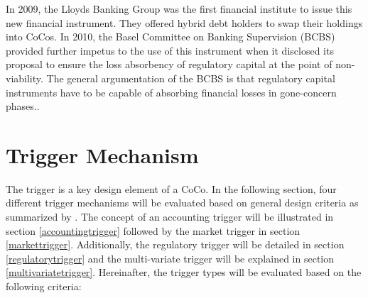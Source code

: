 In 2009, the Lloyds Banking Group was the first financial institute to issue this new financial instrument. They offered hybrid debt holders to swap their holdings into CoCos.\citep{de2011pricing} In 2010, the Basel Committee on Banking Supervision (BCBS) provided further impetus to the use of this instrument when it disclosed its proposal to ensure the loss absorbency of regulatory capital at the point of non-viability. The general argumentation of the BCBS is that regulatory capital instruments have to be capable of absorbing financial losses in gone-concern phases.\citep{basel2010proposal}.



\section{Trigger Mechanism} \label{triggermechanism}

The trigger is a key design element of a CoCo. In the following section, four different trigger mechanisms will be evaluated based on general design criteria as summarized by \citet{erismann2015pricing}. The concept of an accounting trigger will be illustrated in section \ref{accountingtrigger} followed by the market trigger in section \ref{markettrigger}. Additionally, the regulatory trigger will be detailed in section \ref{regulatorytrigger} and the multi-variate trigger will be explained in section \ref{multivariatetrigger}. Hereinafter, the trigger types will be evaluated based on the following criteria:

